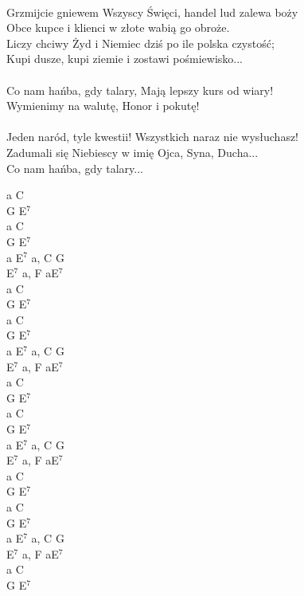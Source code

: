 \documentclass[a5paper, 10pt]{book}
\begin{document}
\begin{minipage}[t]{0.82\textwidth}
  \\
  Grzmijcie gniewem Wszyscy Święci, handel lud zalewa boży\\
  Obce kupce i klienci w złote wabią go obroże.\\
  Liczy chciwy Żyd i Niemiec dziś po ile polska czystość;\\
  Kupi dusze, kupi ziemie i zostawi pośmiewisko...\\
  \\
  \hspace*{3mm}Co nam hańba, gdy talary, Mają lepszy kurs od wiary!\\
  \hspace*{3mm}Wymienimy na walutę, Honor i pokutę!\\
  \\
  Jeden naród, tyle kwestii! Wszystkich naraz nie wysłuchasz!\\
  Zadumali się Niebiescy w imię Ojca, Syna, Ducha...\\
  Co nam hańba, gdy talary...\\
\end{minipage}
\begin{minipage}[t]{0.25\textwidth}
  a C\\
  G E$^7$\\
  a C\\
  G E$^7$\\

  a E$^7$ a, C G\\
  E$^7$ a, F aE$^7$\\

  a C\\
  G E$^7$\\
  a C\\
  G E$^7$\\

  a E$^7$ a, C G\\
  E$^7$ a, F aE$^7$\\

  a C\\
  G E$^7$\\
  a C\\
  G E$^7$\\

  a E$^7$ a, C G\\
  E$^7$ a, F aE$^7$\\

  a C\\
  G E$^7$\\
  a C\\
  G E$^7$\\

  a E$^7$ a, C G\\
  E$^7$ a, F aE$^7$\\

  a C\\
  G E$^7$\\
\end{minipage}
\end{document}
